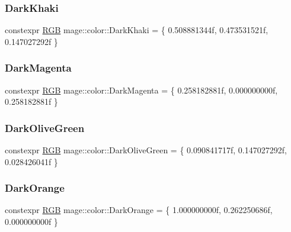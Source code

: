 \subsubsection{\texorpdfstring{Dark\+Khaki}{DarkKhaki}}
{\footnotesize\ttfamily constexpr \hyperlink{structmage_1_1_r_g_b}{R\+GB} mage\+::color\+::\+Dark\+Khaki = \{ 0.\+508881344f, 0.\+473531521f, 0.\+147027292f \}}

\hypertarget{namespacemage_1_1color_a6a72bd256475a691285a9ac994d95361}{}\label{namespacemage_1_1color_a6a72bd256475a691285a9ac994d95361} 
\subsubsection{\texorpdfstring{Dark\+Magenta}{DarkMagenta}}
{\footnotesize\ttfamily constexpr \hyperlink{structmage_1_1_r_g_b}{R\+GB} mage\+::color\+::\+Dark\+Magenta = \{ 0.\+258182881f, 0.\+000000000f, 0.\+258182881f \}}

\hypertarget{namespacemage_1_1color_adb31ce54111ec7b2643ee262367b60a3}{}\label{namespacemage_1_1color_adb31ce54111ec7b2643ee262367b60a3} 
\subsubsection{\texorpdfstring{Dark\+Olive\+Green}{DarkOliveGreen}}
{\footnotesize\ttfamily constexpr \hyperlink{structmage_1_1_r_g_b}{R\+GB} mage\+::color\+::\+Dark\+Olive\+Green = \{ 0.\+090841717f, 0.\+147027292f, 0.\+028426041f \}}

\hypertarget{namespacemage_1_1color_ab204ba538e4ca171b5ae250023e334b0}{}\label{namespacemage_1_1color_ab204ba538e4ca171b5ae250023e334b0} 
\subsubsection{\texorpdfstring{Dark\+Orange}{DarkOrange}}
{\footnotesize\ttfamily constexpr \hyperlink{structmage_1_1_r_g_b}{R\+GB} mage\+::color\+::\+Dark\+Orange = \{ 1.\+000000000f, 0.\+262250686f, 0.\+000000000f \}}

\hypertarget{namespacemage_1_1color_ae1054dbb15cd00a4ffb9c5644d8e2319}{}\label{namespacemage_1_1color_ae1054dbb15cd00a4ffb9c5644d8e2319} 

